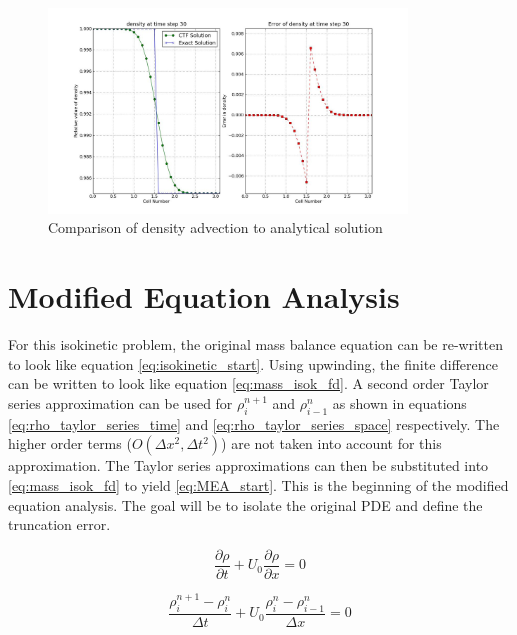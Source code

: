     \begin{figure}[!h]
    	\centering
   		\includegraphics[width=0.85\textwidth]{images/linear_CTF_CFL_0.500/tmp/plot_density_0030}
    	\caption{Comparison of density advection to analytical solution}
    	\label{fig:enthalpy_wave}
    \end{figure}
    
    \section{Modified Equation Analysis}
    
    For this isokinetic problem, the original mass balance equation can be re-written to 
    look like equation \ref{eq:isokinetic_start}. Using upwinding, the finite difference
    can be written to look like equation \ref{eq:mass_isok_fd}. A second order Taylor 
    series approximation can be used for $\rho_{i}^{n+1}$ and $\rho_{i-1}^{n}$ as shown 
    in equations \ref{eq:rho_taylor_series_time} and \ref{eq:rho_taylor_series_space} 
    respectively. The higher order terms ($O(\Delta x^{2},\Delta t^{2} )$) are
    not taken into account for this approximation. The Taylor series
    approximations can then be substituted into \ref{eq:mass_isok_fd} to yield
    \ref{eq:MEA_start}. This is the beginning of the modified equation analysis.
    The goal will be to isolate the original PDE and define the truncation error.
    
    \begin{equation}
    	\label{eq:isokinetic_start}
    	\frac{\partial \rho}{\partial t} + U_{0} \frac{\partial \rho}{\partial x} = 0
    \end{equation}
    
    \begin{equation}
    	\label{eq:mass_isok_fd}
    	\frac{ \rho_{i}^{n+1} - \rho_{i}^{n} }{\Delta t} 
    	+ U_{0} \frac{\rho_{i}^{n} - \rho_{i-1}^{n}}{\Delta x} = 0
    \end{equation}
    
